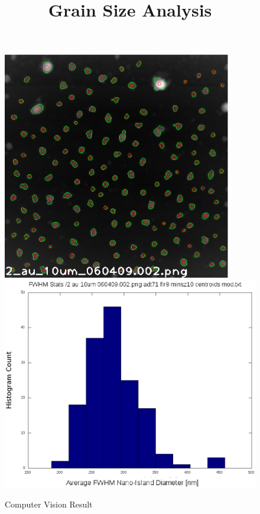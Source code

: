 \documentclass[12pt,oneside,english]{article}
\begin{document}
	\title{Grain Size Analysis}
	
	\maketitle

	\begin{figure}
	\center
	\includegraphics[width=100mm]{images/2_au_10um_060409.002.png_adt71_flr8_minsz10_outlines.eps}
	\includegraphics[width=140mm]{images/2_au_10um_060409.002.png_adt71_flr8_minsz10_histogram_fwhm.eps}
	\caption{Computer Vision Result}
	\label{f:cvPromo}
	\end{figure}
\end{document}
